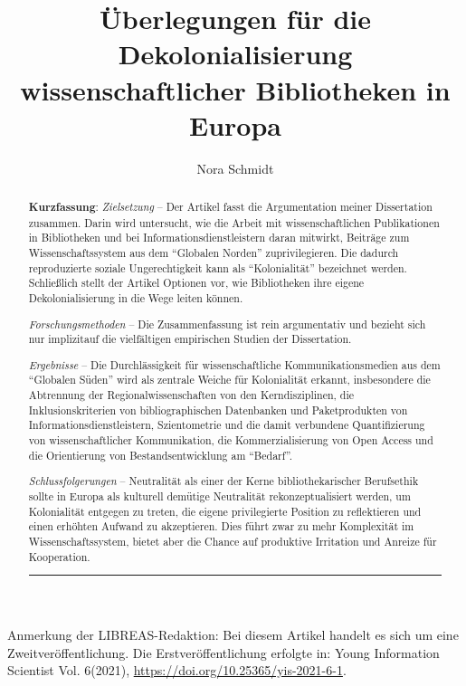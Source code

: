 \documentclass[a4paper,
fontsize=11pt,
oneside,
numbers=noperiodatend,
parskip=half-,
bibliography=totoc,
final
]{scrartcl}
\title{\LARGE{Überlegungen für die Dekolonialisierung wissenschaftlicher Bibliotheken in Europa
}}%
\author{Nora Schmidt} %
\date{}
\begin{document}
\maketitle
\thispagestyle{fancyplain} 

Anmerkung der LIBREAS-Redaktion: Bei diesem Artikel handelt es sich um eine Zweitveröffentlichung. Die Erstveröffentlichung erfolgte in: Young Information Scientist Vol. 6(2021), \url{https://doi.org/10.25365/yis-2021-6-1}.

\begin{abstract}
\noindent
\textbf{Kurzfassung}: \textit{Zielsetzung} -- Der Artikel fasst die Argumentation
meiner Dissertation zusammen. Darin wird untersucht, wie die Arbeit mit
wissenschaftlichen Publikationen in Bibliotheken und bei
Informationsdienstleistern daran mitwirkt, Beiträge zum
Wissenschaftssystem aus dem \enquote{Globalen Norden} zuprivilegieren. Die
dadurch reproduzierte soziale Ungerechtigkeit kann als \enquote{Kolonialität}
bezeichnet werden. Schließlich stellt der Artikel Optionen vor, wie
Bibliotheken ihre eigene Dekolonialisierung in die Wege leiten können.

\textit{Forschungsmethoden} -- Die Zusammenfassung ist rein argumentativ und
bezieht sich nur implizitauf die vielfältigen empirischen Studien der
Dissertation.

\textit{Ergebnisse} -- Die Durchlässigkeit für wissenschaftliche
Kommunikationsmedien \linebreak aus dem \enquote{Globalen Süden} wird als zentrale Weiche
für Kolonialität erkannt, insbesondere die Abtrennung der
Regionalwissenschaften von den Kerndisziplinen, die Inklusionskriterien
von bibliographischen Datenbanken und Paketprodukten von
Informationsdienstleistern, Szientometrie und die damit verbundene
Quantifizierung von wissenschaftlicher Kommunikation, die
Kommerzialisierung von Open Access und die Orientierung von
Bestandsentwicklung am \enquote{Bedarf}.

\textit{Schlussfolgerungen} -- Neutralität als einer der Kerne bibliothekarischer
Berufsethik sollte in Europa als kulturell demütige Neutralität
rekonzeptualisiert werden, um Kolonialität entgegen zu treten, die
eigene privilegierte Position zu reflektieren und einen erhöhten Aufwand
zu akzeptieren. Dies führt zwar zu mehr Komplexität im
Wissenschaftssystem, bietet aber die Chance auf produktive Irritation
und Anreize für Kooperation.

\begin{center}\rule{0.5\linewidth}{0.5pt}\end{center}


\end{abstract}
\end{document}
